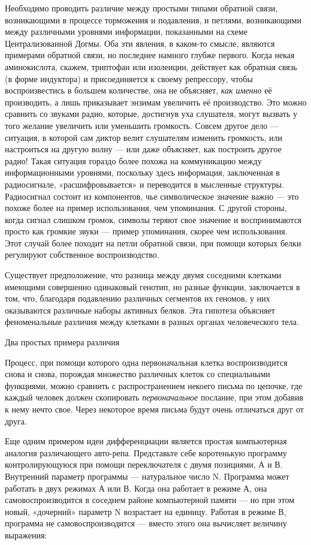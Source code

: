 \documentclass[../main.tex]{subfiles}
\begin{document}
Необходимо проводить различие между простыми типами обратной связи, возникающими в процессе торможения и подавления, и петлями, возникающими между различными уровнями информации, показанными на схеме Централизованной Догмы. Оба эти явления, в каком-то смысле, являются примерами обратной связи, но последнее намного глубже первого. Когда некая аминокислота, скажем, триптофан или изолеицин, действует как обратная связь (в форме индуктора) и присоединяется к своему репрессору, чтобы воспроизвестись в большем количестве, она не объясняет, \emph{как именно} её производить, а лишь приказывает энзимам увеличить её производство. Это можно сравнить со звуками радио, которые, достигнув уха слушателя, могут вызвать у того желание увеличить или уменьшить громкость. Совсем другое дело --- ситуация, в которой сам диктор велит слушателям изменить громкость, или настроиться на другую волну --- или даже объясняет, как построить другое радио! Такая ситуация гораздо более похожа на коммуникацию между информационными уровнями, поскольку здесь информация, заключенная в радиосигнале, «расшифровывается» и переводится в мысленные структуры. Радиосигнал состоит из компонентов, чье символическое значение важно --- это похоже более на пример использования, чем упоминания. С другой стороны, когда сигнал слишком громок, символы теряют свое значение и воспринимаются просто как громкие звуки --- пример упоминания, скорее чем использования. Этот случай более походит на петли обратной связи, при помощи которых белки регулируют собственное воспроизводство.

Существует предположение, что разница между двумя соседними клетками имеющими совершенно одинаковый генотип, но разные функции, заключается в том, что, благодаря подавлению различных сегментов их геномов, у них оказываются различные наборы активных белков. Эта гипотеза объясняет феноменальные различия между клетками в разных органах человеческого тела.

Два простых примера различия

Процесс, при помощи которого одна первоначальная клетка воспроизводится снова и снова, порождая множество различных клеток со специальными функциями, можно сравнить с распространением некоего письма по цепочке, где каждый человек должен скопировать \emph{первоначальное} послание, при этом добавив к нему нечто свое. Через некоторое время письма будут очень отличаться друг от друга.

Еще одним примером идеи дифференциации является простая компьютерная аналогия различающего авто-репа. Представьте себе коротенькую программу контролирующуюся при помощи переключателя с двумя позициями, А и В. Внутренний параметр программы --- натуральное число N. Программа может работать в двух режимах А или В. Когда она работает в режиме А, она самовоспроизводится в соседнем районе компьютерной памяти --- но при этом новый, «дочерний» параметр N возрастает на единицу. Работая в режиме В, программа не самовоспроизводится --- вместо этого она вычисляет величину выражения:
\end{document}
